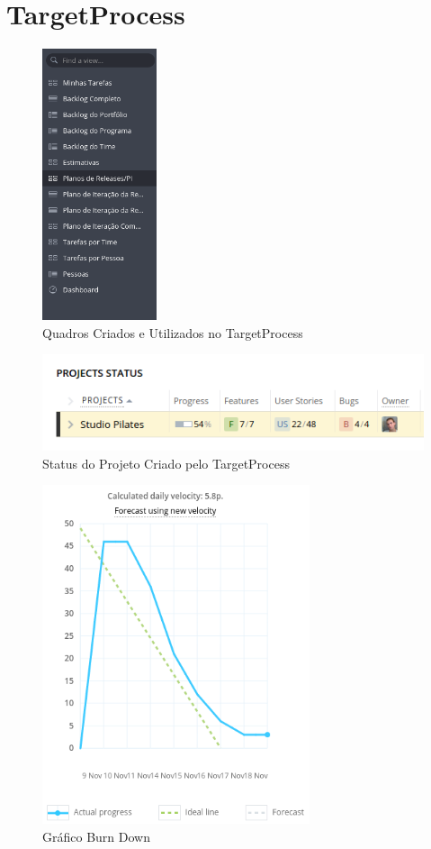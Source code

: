 \section[TargetProcess]{TargetProcess}
\begin{figure}[!htb]
    \centering
    \includegraphics[width=0.3\textwidth]{figuras/quadros.png}
    \caption{Quadros Criados e Utilizados no TargetProcess}
    \label{fig:quadros}
\end{figure}

\begin{figure}[!htb]
    \centering
    \includegraphics[width=\textwidth]{figuras/status_projeto.png}
    \caption{Status do Projeto Criado pelo TargetProcess}
    \label{fig:status_projeto}
\end{figure}

\begin{figure}[!htb]
    \centering
    \includegraphics[width=0.7\textwidth]{figuras/burn_down.png}
    \caption{Gráfico Burn Down}
    \label{fig:burn_down}
\end{figure}